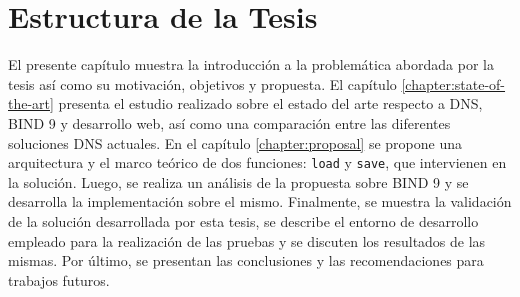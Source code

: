 \section{Estructura de la Tesis}

El presente capítulo muestra la introducción a la problemática abordada
por la tesis así como su motivación, objetivos y propuesta. El capítulo \ref{chapter:state-of-the-art} presenta el estudio realizado sobre el estado del arte respecto a DNS, BIND 9 y desarrollo web, así como una comparación entre las diferentes soluciones DNS actuales. En el capítulo \ref{chapter:proposal} se propone una arquitectura y el marco teórico de dos funciones: \verb|load| y \verb|save|, que intervienen en la solución. Luego, se realiza un análisis de la propuesta sobre BIND 9 y se desarrolla la implementación sobre el mismo. Finalmente, se muestra la validación de la solución desarrollada por esta tesis, se describe el entorno de desarrollo empleado para la realización de las pruebas y se discuten los resultados de las mismas. Por último, se presentan las conclusiones y las recomendaciones para trabajos futuros.